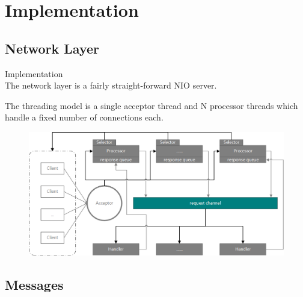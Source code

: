 \section{Implementation}
\subsection{Network Layer}
\begin{frame}[plain,t]{Implementation} %
     \\
    \vspace{2ex}
    The network layer is a fairly straight-forward NIO server.
    
    \vspace{2ex}
    The threading model is a single acceptor thread and N processor threads which handle a fixed number of connections each. 
    
    \vspace{1ex}
    \begin{figure}
        \centering
        \includegraphics[width=0.9\linewidth]{image/0301}
        \label{fig:0301}
    \end{figure}
\end{frame}
\subsection{Messages}

